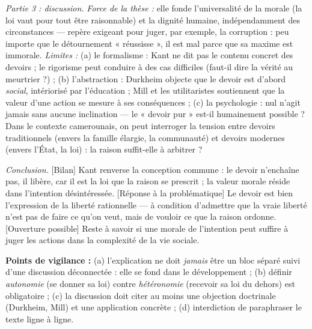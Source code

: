 \documentclass[11pt]{article}
\begin{document}
\begin{exoresolu}
\emph{Partie 3 : discussion.} \emph{Force de la thèse :} elle fonde l'universalité de la morale (la loi vaut pour tout être raisonnable) et la dignité humaine, indépendamment des circonstances — repère exigeant pour juger, par exemple, la corruption : peu importe que le détournement « réussisse », il est mal parce que sa maxime est immorale. \emph{Limites :} (a) le formalisme : Kant ne dit pas le contenu concret des devoirs ; le rigorisme peut conduire à des cas difficiles (faut-il dire la vérité au meurtrier ?) ; (b) l'abstraction : Durkheim objecte que le devoir est d'abord \emph{social}, intériorisé par l'éducation ; Mill et les utilitaristes soutiennent que la valeur d'une action se mesure à ses conséquences ; (c) la psychologie : nul n'agit jamais sans aucune inclination — le « devoir pur » est-il humainement possible ? Dans le contexte camerounais, on peut interroger la tension entre devoirs traditionnels (envers la famille élargie, la communauté) et devoirs modernes (envers l'État, la loi) : la raison suffit-elle à arbitrer ?

\emph{Conclusion.} [Bilan] Kant renverse la conception commune : le devoir n'enchaîne pas, il libère, car il est la loi que la raison se prescrit ; la valeur morale réside dans l'intention désintéressée. [Réponse à la problématique] Le devoir est bien l'expression de la liberté rationnelle — à condition d'admettre que la vraie liberté n'est pas de faire ce qu'on veut, mais de vouloir ce que la raison ordonne. [Ouverture possible] Reste à savoir si une morale de l'intention peut suffire à juger les actions dans la complexité de la vie sociale.

\textbf{Points de vigilance :} (a) l'explication ne doit \emph{jamais} être un bloc séparé suivi d'une discussion déconnectée : elle se fond dans le développement ; (b) définir \emph{autonomie} (se donner sa loi) contre \emph{hétéronomie} (recevoir sa loi du dehors) est obligatoire ; (c) la discussion doit citer au moins une objection doctrinale (Durkheim, Mill) et une application concrète ; (d) interdiction de paraphraser le texte ligne à ligne.
\end{exoresolu}
\end{document}
